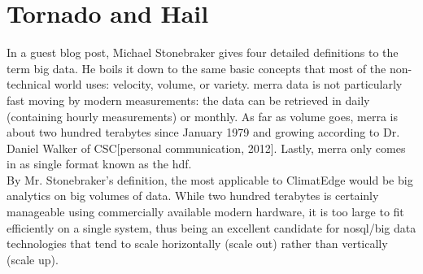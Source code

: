 


\chapter{Tornado and Hail}
In a guest blog post, Michael Stonebraker gives four detailed definitions to the term big data\cite{stonebraker}. He boils it down to the same basic concepts that most of the non-technical world uses: velocity, volume, or variety. \gls{merra} data is not particularly fast moving by modern measurements: the data can be retrieved in daily (containing hourly measurements) or monthly. As far as volume goes, \gls{merra} is about two hundred terabytes since January 1979 and growing according to Dr. Daniel Walker of CSC[personal communication, 2012]. Lastly, \gls{merra} only comes in as single format known as the \gls{hdf}\cite{hdf}.\\

By Mr. Stonebraker's definition, the most applicable to ClimatEdge\texttrademark{} would be big analytics on big volumes of data. While two hundred terabytes is certainly manageable using commercially available modern hardware, it is too large to fit efficiently on a single system, thus being an excellent candidate for \gls{nosql}/big data technologies that tend to scale horizontally (scale out) rather than vertically (scale up).




\renewcommand\bibname{{References}}





